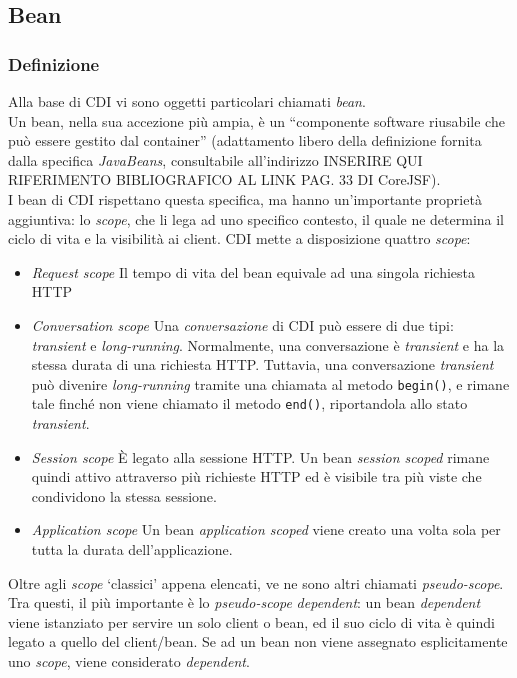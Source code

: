 \subsection{Bean}

\subsubsection{Definizione}
Alla base di CDI vi sono oggetti particolari chiamati \textsl{bean}.\\
Un bean, nella sua accezione più ampia, è un \textquotedblleft componente software riusabile che può essere gestito dal container\textquotedblright{} (adattamento libero della definizione fornita dalla specifica \textsl{JavaBeans}, consultabile all'indirizzo INSERIRE QUI RIFERIMENTO BIBLIOGRAFICO AL LINK PAG. 33 DI CoreJSF).\\
I bean di CDI rispettano questa specifica, ma hanno un'importante proprietà aggiuntiva: lo \textit{scope}, che li lega ad uno specifico contesto, il quale ne determina il ciclo di vita e la visibilità ai client.
CDI mette a disposizione quattro \textit{scope}:
\begin{itemize}
\item \textit{Request scope} Il tempo di vita del bean equivale ad una singola richiesta HTTP
\item \textit{Conversation scope} Una \textsl{conversazione} di CDI può essere di due tipi: \textit{transient} e \textit{long-running}. Normalmente, una conversazione è \textit{transient} e ha la stessa durata di una richiesta HTTP. Tuttavia, una conversazione \textit{transient} può divenire \textit{long-running} tramite una chiamata al metodo \lstinline{begin()}, e rimane tale finché non viene chiamato il metodo \lstinline{end()}, riportandola allo stato \textit{transient}.
\item \textit{Session scope} È legato alla sessione HTTP. Un bean \textit{session scoped} rimane quindi attivo attraverso più richieste HTTP ed è visibile tra più viste che condividono la stessa sessione.
\item \textit{Application scope} Un bean \textit{application scoped} viene creato una volta sola per tutta la durata dell'applicazione.
\end{itemize}

Oltre agli \textit{scope} \textquoteleft classici\textquoteright{} appena elencati, ve ne sono altri chiamati \textit{pseudo-scope}. Tra questi, il più importante è lo \textit{pseudo-scope} \textit{dependent}: un bean \textit{dependent} viene istanziato per servire un solo client o bean, ed il suo ciclo di vita è quindi legato a quello del client/bean. Se ad un bean non viene assegnato esplicitamente uno \textit{scope}, viene considerato \textit{dependent}.\\\\

